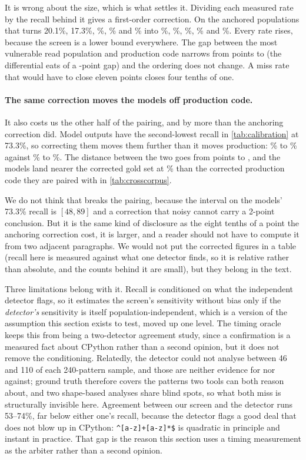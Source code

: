 \documentclass[11pt]{article}
\begin{document}
It is wrong about the size, which is what settles it. Dividing each measured
rate by the recall behind it gives a first-order correction. On the anchored
populations that turns 20.1\%, 17.3\%, \anchoredgold{}\%, \anchoredmodels{}\%
and \anchoredprod{}\% into \corrlib{}\%, \corrso{}\%, \corrgold{}\%,
\corrmodels{}\% and \corrprod{}\%. Every rate rises, because the screen is a
lower bound everywhere. The gap between the most vulnerable read population
and production code narrows from \gapraw{} points to \gapcorr{} (the
differential eats \gapclosed{} of a \gapraw{}-point gap) and the ordering
does not change. A miss rate that would have to close eleven points closes
four tenths of one.

\paragraph{The same correction moves the models off production code.} It also
costs us the other half of the pairing, and by more than the anchoring
correction did. Model outputs have the second-lowest recall in
\cref{tab:calibration} at 73.3\%, so correcting them moves them further than
it moves production: \anchoredmodels{}\% to \corrmodels{}\% against
\anchoredprod{}\% to \corrprod{}\%. The distance between the two goes from
\modelprodraw{} points to \modelprodcorr{}, and the models land nearer the
corrected gold set at \corrgold{}\% than the corrected production code they
are paired with in \cref{tab:crosscorpus}.

We do not think that breaks the pairing, because the interval on the models'
73.3\% recall is $[48, 89]$ and a correction that noisy cannot carry a
2-point conclusion. But it is the same kind of disclosure as the eight tenths
of a point the anchoring correction cost, it is larger, and a reader should
not have to compute it from two adjacent paragraphs. We would not put the
corrected figures in a table (recall here is measured against what one
detector finds, so it is relative rather than absolute, and the counts behind
it are small), but they belong in the text.

Three limitations belong with it. Recall is conditioned on what the
independent detector flags, so it estimates the screen's sensitivity without
bias only if the \emph{detector's} sensitivity is itself
population-independent, which is a version of the assumption this section
exists to test, moved up one level. The timing oracle keeps this from being a
two-detector agreement study, since a confirmation is a measured fact about
CPython rather than a second opinion, but it does not remove the conditioning.
Relatedly, the detector could not analyse between 46 and 110 of each
240-pattern sample, and those are neither evidence for nor against; ground
truth therefore covers the patterns two tools can both reason about, and two
shape-based analyses share blind spots, so what both miss is structurally
invisible here. Agreement between our screen and
the detector runs 53--74\%, far below either one's recall, because the
detector flags a good deal that does not blow up in CPython:
\lstinline!^[a-z]+[a-z]*$! is quadratic in principle and instant in practice.
That gap is the reason this section uses a timing measurement as the arbiter
rather than a second opinion.
\end{document}
